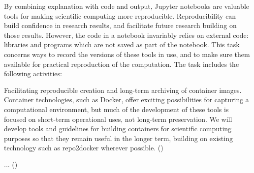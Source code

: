 \begin{task}[title=Archiving software for reproducible workflows,
  id=reproducibility,
  lead=XXX,
  PM=1,
  wphases={0-48},
  partners={SRL,XFEL}
]
  By combining explanation with code and output, Jupyter notebooks are
  valuable tools for making scientific computing more reproducible.
  Reproducibility can build confidence in research results, and facilitate
  future research building on those results.
  However, the code in a notebook invariably relies on external code: libraries
  and programs which are not saved as part of the notebook.
  This task concerns ways to record the versions of these tools in use, and to
  make sure them available for practical reproduction of the computation.
  The task includes the following activities:
  \begin{compactitem}
  \item Facilitating reproducible creation and long-term archiving of container
    images. Container technologies, such as Docker, offer exciting possibilities
    for capturing a computational environment, but much of the development of
    these tools is focused on short-term operational uses, not long-term
    preservation. We will develop tools and guidelines for building containers
    for scientific computing purposes so that they remain useful in the longer
    term, building on existing technology such as repo2docker wherever possible.
    ()
  \end{compactitem}
  \begin{compactitem}
  \item ...
    ()
  \end{compactitem}
\end{task}

